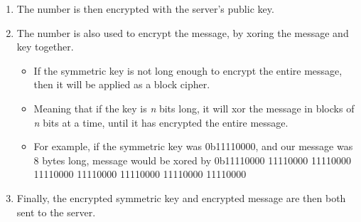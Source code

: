 {\begin{enumerate}
\begin{enumerate}[1.]
                            \item The number is then encrypted with the server's public key.







                            \item The number is also used to encrypt the message, by xoring the message and key together.







                            \begin{itemize}







                                \item If the symmetric key is not long enough to encrypt the entire message, then it will be applied as a block cipher.







                                \item Meaning that if the key is \textit{n} bits long, it will xor the message in blocks of \textit{n} bits at a time, until it has encrypted the entire message.







                                \item For example, if the symmetric key was 0b11110000, and our message was 8 bytes long, message would be xored by 0b11110000 11110000 11110000 11110000 11110000 11110000 11110000 11110000







                            \end{itemize}







                            \item Finally, the encrypted symmetric key and encrypted message are then both sent to the server.








\end{enumerate}
\end{enumerate}}
